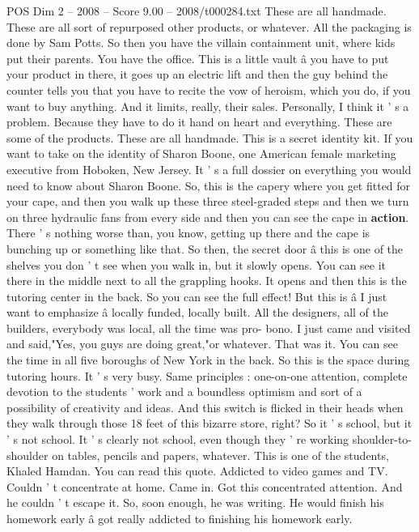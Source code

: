 \begin{textsample}{POS Dim 2 – 2008 – Score 9.00 – 2008/t000284.txt}
These are all handmade.
These are all sort of repurposed other products, or whatever.
All the packaging is done by Sam Potts.
So then you have the villain containment unit, where kids put their parents.
You have the office.
This is a little vault â you have to put your product in there, it goes up an electric lift and then the guy behind the counter tells you that you have to recite the vow of heroism, which you do, if you want to buy anything.
And it limits, really, their sales.
Personally, I think it ' s a problem.
Because they have to do it hand on heart and everything.
These are some of the products.
These are all handmade.
This is a secret identity kit.
If you want to take on the identity of Sharon Boone, one American female marketing executive from Hoboken, New Jersey.
It ' s a full dossier on everything you would need to know about Sharon Boone.
So, this is the capery where you get fitted for your cape, and then you walk up these three steel-graded steps and then we turn on three hydraulic fans from every side and then you can see the cape in \textbf{action}.
There ' s nothing worse than, you know, getting up there and the cape is bunching up or something like that.
So then, the secret door â this is one of the shelves you don ' t see when you walk in, but it slowly opens.
You can see it there in the middle next to all the grappling hooks.
It opens and then this is the tutoring center in the back.
So you can see the full effect!
But this is â I just want to emphasize â locally funded, locally built.
All the designers, all of the builders, everybody was local, all the time was pro- bono.
I just came and visited and said,"Yes, you guys are doing great,"or whatever.
That was it.
You can see the time in all five boroughs of New York in the back.
So this is the space during tutoring hours.
It ' s very busy.
Same principles : one-on-one attention, complete devotion to the students ' work and a boundless optimism and sort of a possibility of creativity and ideas.
And this switch is flicked in their heads when they walk through those 18 feet of this bizarre store, right?
So it ' s school, but it ' s not school.
It ' s clearly not school, even though they ' re working shoulder-to- shoulder on tables, pencils and papers, whatever.
This is one of the students, Khaled Hamdan.
You can read this quote.
Addicted to video games and TV.
Couldn ' t concentrate at home.
Came in.
Got this concentrated attention.
And he couldn ' t escape it.
So, soon enough, he was writing.
He would finish his homework early â got really addicted to finishing his homework early.

\end{textsample}
